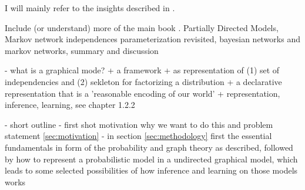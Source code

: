 I will mainly refer to the insights described in \cite{koller2009probabilistic}.

Include (or understand) more of the main book \cite{koller2009probabilistic}. Partially Directed Models, Markov network independences parameterization revisited, bayesian networks and markov networks, summary and discussion

- what is a graphical mode?
 + a framework
 + as representation of (1) set of independencies and (2) sekleton for factorizing a distribution
 + a declarative representation that is a 'reasonable encoding of our world'
 + representation, inference, learning, see chapter 1.2.2

- short outline
 - first shot motivation why we want to do this and problem statement \ref{sec:motivation}
 - in section \ref{sec:methodology} first the essential fundamentals in form of the probability and graph theory as described, followed by how to represent a probabilistic model in a undirected graphical model, which leads to some selected possibilities of how inference and learning on those models works
